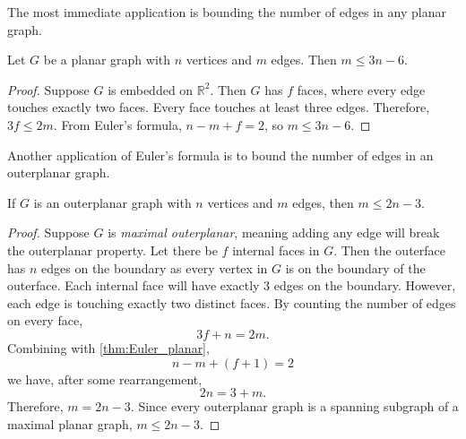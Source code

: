 The most immediate application is bounding the number of edges in any planar graph.
\begin{proposition}\label{thm:planar_graph_edge_bound}
	Let $G$ be a planar graph with $n$ vertices and $m$ edges. Then $m \leq 3n - 6$.
\end{proposition}
\begin{proof}
	Suppose $G$ is embedded on $\mathbb{R}^2$. Then $G$ has $f$ faces, where every edge touches exactly two faces. Every face touches at least three edges. Therefore, $3f \leq 2m$. From Euler's formula, $n - m + f = 2$, so $m \leq 3n - 6$. 
\end{proof}

Another application of Euler's formula is to bound the number of edges in an outerplanar graph.
\begin{proposition}\label{thm:outerplanar_bound}
	If \(G\) is an outerplanar graph with \(n\) vertices and \(m\) edges, then \(m \leq 2n - 3\).
\end{proposition}

\begin{proof}
	Suppose \(G\) is \textit{maximal outerplanar}, meaning adding any edge will break the outerplanar property. Let there be \(f\) internal faces in $G$. Then the outerface has \(n\) edges on the boundary as every vertex in $G$ is on the boundary of the outerface. Each internal face will have exactly \(3\) edges on the boundary. However, each edge is touching exactly two distinct faces. By counting the number of edges on every face,
	\begin{equation*}
		3 f + n = 2m.
	\end{equation*}
	Combining with \cref{thm:Euler_planar},
	\begin{equation*}
		n - m + (f + 1) = 2
	\end{equation*}
	we have, after some rearrangement,
	\begin{equation*}
		2n = 3 + m.
	\end{equation*}
	Therefore, \(m = 2n - 3\). Since every outerplanar graph is a spanning subgraph of a maximal planar graph, \(m \leq 2n - 3\).
\end{proof}
